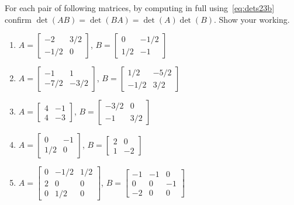 \begin{exercise} \label{ex:default} 
For each pair of following matrices, by computing in full using~\eqref{eq:dets23b} confirm \(\det(AB)=\det(BA)=\det(A)\det(B)\). 
Show your working.
\begin{enumerate}
\item \(A=\begin{bmatrix} -2&3/2
\\-1/2&0 \end{bmatrix}\), 
\(B=\begin{bmatrix} 0&-1/2
\\1/2&-1 \end{bmatrix}\)

\item \(A=\begin{bmatrix} -1&1
\\-7/2&-3/2 \end{bmatrix}\), 
\(B=\begin{bmatrix} 1/2&-5/2
\\-1/2&3/2 \end{bmatrix}\)

\item \(A=\begin{bmatrix} 4&-1
\\4&-3 \end{bmatrix}\), 
\(B=\begin{bmatrix} -3/2&0
\\-1&3/2 \end{bmatrix}\)

\item \(A=\begin{bmatrix} 0&-1
\\1/2&0 \end{bmatrix}\), 
\(B=\begin{bmatrix} 2&0
\\1&-2 \end{bmatrix}\)


\item \(A=\begin{bmatrix} 0&-1/2&1/2
\\2&0&0
\\0&1/2&0 \end{bmatrix}\), 
\(B=\begin{bmatrix} -1&-1&0
\\0&0&-1
\\-2&0&0 \end{bmatrix}\)


\end{enumerate}
\end{exercise}
